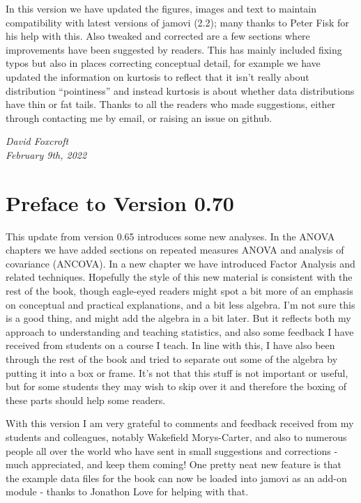 \documentclass[
]{book}
\begin{document}
In this version we have updated the figures, images and text to maintain
compatibility with latest versions of jamovi (2.2); many thanks to Peter
Fisk for his help with this. Also tweaked and corrected are a few
sections where improvements have been suggested by readers. This has
mainly included fixing typos but also in places correcting conceptual
detail, for example we have updated the information on kurtosis to
reflect that it isn't really about distribution ``pointiness'' and instead
kurtosis is about whether data distributions have thin or fat tails.
Thanks to all the readers who made suggestions, either through
contacting me by email, or raising an issue on github.

\emph{David Foxcroft\\
February 9th, 2022}

\hypertarget{preface-to-version-0.70}{%
\section*{Preface to Version 0.70}\label{preface-to-version-0.70}}

This update from version 0.65 introduces some new analyses. In the ANOVA
chapters we have added sections on repeated measures ANOVA and analysis
of covariance (ANCOVA). In a new chapter we have introduced Factor
Analysis and related techniques. Hopefully the style of this new
material is consistent with the rest of the book, though eagle-eyed
readers might spot a bit more of an emphasis on conceptual and practical
explanations, and a bit less algebra. I'm not sure this is a good thing,
and might add the algebra in a bit later. But it reflects both my
approach to understanding and teaching statistics, and also some
feedback I have received from students on a course I teach. In line with
this, I have also been through the rest of the book and tried to
separate out some of the algebra by putting it into a box or frame. It's
not that this stuff is not important or useful, but for some students
they may wish to skip over it and therefore the boxing of these parts
should help some readers.

With this version I am very grateful to comments and feedback received
from my students and colleagues, notably Wakefield Morys-Carter, and
also to numerous people all over the world who have sent in small
suggestions and corrections - much appreciated, and keep them coming!
One pretty neat new feature is that the example data files for the book
can now be loaded into jamovi as an add-on module - thanks to Jonathon
Love for helping with that.
\end{document}
